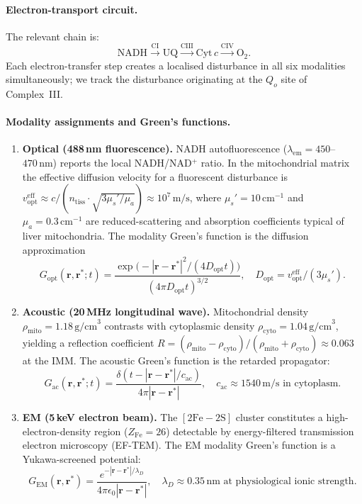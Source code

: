 \paragraph{Electron-transport circuit.}
The relevant chain is:
\[
  \text{NADH} \xrightarrow{\text{CI}} \text{UQ}
             \xrightarrow{\text{CIII}} \text{Cyt}\,c
             \xrightarrow{\text{CIV}} \text{O}_2.
\]
Each electron-transfer step creates a localised disturbance in all six
modalities simultaneously; we track the disturbance originating at the
$Q_o$ site of Complex~III.

\paragraph{Modality assignments and Green's functions.}

\begin{enumerate}[label=(\arabic*),leftmargin=2em]
\item \textbf{Optical (488\,nm fluorescence).}
  NADH autofluorescence ($\lambda_\text{em} = 450$--$470\,\text{nm}$)
  reports the local NADH/NAD$^+$ ratio.  In the mitochondrial matrix the
  effective diffusion velocity for a fluorescent disturbance is
  $v_\text{opt}^\text{eff} \approx c/(n_\text{tiss}\cdot\sqrt{3\mu_s'/\mu_a})
  \approx 10^7\,\text{m/s}$, where $\mu_s' = 10\,\text{cm}^{-1}$ and
  $\mu_a = 0.3\,\text{cm}^{-1}$ are reduced-scattering and absorption
  coefficients typical of liver mitochondria.  The modality Green's
  function is the diffusion approximation
  \[
    G_\text{opt}(\mathbf{r},\mathbf{r}^*;t)
    = \frac{\exp\!\bigl(-|\mathbf{r}-\mathbf{r}^*|^2/(4D_\text{opt}t)\bigr)}
           {(4\pi D_\text{opt}t)^{3/2}},
    \quad D_\text{opt} = v_\text{opt}^\text{eff}/(3\mu_s').
  \]

\item \textbf{Acoustic (20\,MHz longitudinal wave).}
  Mitochondrial density $\rho_\text{mito} = 1.18\,\text{g/cm}^3$ contrasts
  with cytoplasmic density $\rho_\text{cyto} = 1.04\,\text{g/cm}^3$,
  yielding a reflection coefficient $R = (\rho_\text{mito} -
  \rho_\text{cyto})/(\rho_\text{mito} + \rho_\text{cyto}) \approx 0.063$
  at the IMM.  The acoustic Green's function is the retarded propagator:
  \[
    G_\text{ac}(\mathbf{r},\mathbf{r}^*;t)
    = \frac{\delta(t - |\mathbf{r}-\mathbf{r}^*|/c_\text{ac})}{4\pi
      |\mathbf{r}-\mathbf{r}^*|},
    \quad c_\text{ac} \approx 1540\,\text{m/s}\text{ in cytoplasm}.
  \]

\item \textbf{EM (5\,keV electron beam).}
  The $[2\text{Fe}{-}2\text{S}]$ cluster constitutes a high-electron-density
  region ($Z_\text{Fe} = 26$) detectable by energy-filtered transmission
  electron microscopy (EF-TEM).  The EM modality Green's function is a
  Yukawa-screened potential:
  \[
    G_\text{EM}(\mathbf{r},\mathbf{r}^*) = \frac{e^{-|\mathbf{r}-\mathbf{r}^*|
    /\lambda_D}}{4\pi\epsilon_0|\mathbf{r}-\mathbf{r}^*|},
    \quad \lambda_D \approx 0.35\,\text{nm}\text{ at physiological ionic strength}.
  \]


\end{enumerate}
